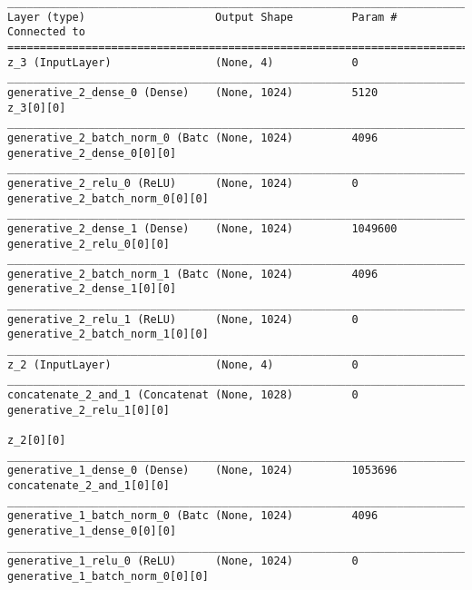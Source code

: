 \begin{lstlisting}[caption={\textsc{Mnist}-\ac{VLAE}-\ac{GAN} Decoder},captionpos=b,basicstyle=\tiny, label={lst:mnist-vlae-gan-decoder}]
__________________________________________________________________________________________________
Layer (type)                    Output Shape         Param #     Connected to
==================================================================================================
z_3 (InputLayer)                (None, 4)            0
__________________________________________________________________________________________________
generative_2_dense_0 (Dense)    (None, 1024)         5120        z_3[0][0]
__________________________________________________________________________________________________
generative_2_batch_norm_0 (Batc (None, 1024)         4096        generative_2_dense_0[0][0]
__________________________________________________________________________________________________
generative_2_relu_0 (ReLU)      (None, 1024)         0           generative_2_batch_norm_0[0][0]
__________________________________________________________________________________________________
generative_2_dense_1 (Dense)    (None, 1024)         1049600     generative_2_relu_0[0][0]
__________________________________________________________________________________________________
generative_2_batch_norm_1 (Batc (None, 1024)         4096        generative_2_dense_1[0][0]
__________________________________________________________________________________________________
generative_2_relu_1 (ReLU)      (None, 1024)         0           generative_2_batch_norm_1[0][0]
__________________________________________________________________________________________________
z_2 (InputLayer)                (None, 4)            0
__________________________________________________________________________________________________
concatenate_2_and_1 (Concatenat (None, 1028)         0           generative_2_relu_1[0][0]
                                                                 z_2[0][0]
__________________________________________________________________________________________________
generative_1_dense_0 (Dense)    (None, 1024)         1053696     concatenate_2_and_1[0][0]
__________________________________________________________________________________________________
generative_1_batch_norm_0 (Batc (None, 1024)         4096        generative_1_dense_0[0][0]
__________________________________________________________________________________________________
generative_1_relu_0 (ReLU)      (None, 1024)         0           generative_1_batch_norm_0[0][0]

\end{lstlisting}
